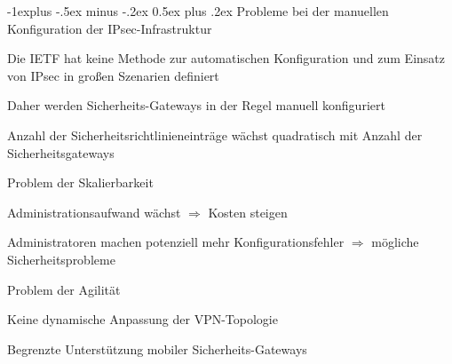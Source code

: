 \documentclass[a4paper]{article}
\makeatletter
\renewcommand{\subsection}{\@startsection{subsection}{2}{0mm}%
 {-1explus -.5ex minus -.2ex}%
 {0.5ex plus .2ex}%
 {\normalfont\normalsize\bfseries}}
\makeatother
\begin{document}
\begin{multicols}{3}
      \subsection{Probleme bei der manuellen Konfiguration der IPsec-Infrastruktur}
      \begin{itemize*}
            \item Die IETF hat keine Methode zur automatischen Konfiguration und zum Einsatz von IPsec in großen Szenarien definiert
            \item Daher werden Sicherheits-Gateways in der Regel manuell konfiguriert
            \item Anzahl der Sicherheitsrichtlinieneinträge wächst quadratisch mit Anzahl der Sicherheitsgateways
            \item Problem der Skalierbarkeit
            \begin{itemize*}
                  \item Administrationsaufwand wächst $\Rightarrow$ Kosten steigen
                  \item Administratoren machen potenziell mehr Konfigurationsfehler %
                  $\Rightarrow$ mögliche Sicherheitsprobleme
            \end{itemize*}
            \item Problem der Agilität
            \begin{itemize*}
                  \item Keine dynamische Anpassung der VPN-Topologie
                  \item Begrenzte Unterstützung mobiler Sicherheits-Gateways
            \end{itemize*}
      \end{itemize*}


\end{multicols}
\end{document}
